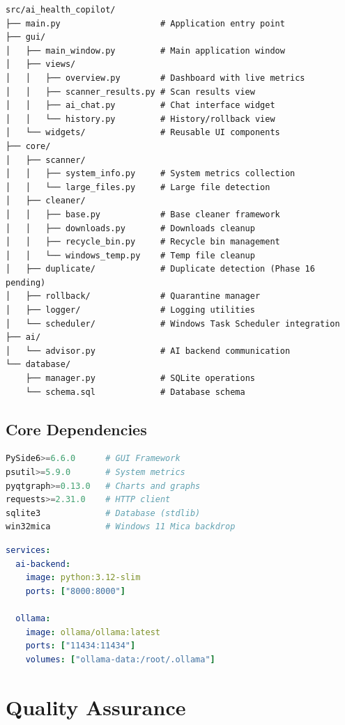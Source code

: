 \documentclass[11pt,a4paper]{article}
\begin{document}
\begin{verbatim}
src/ai_health_copilot/
├── main.py                    # Application entry point
├── gui/
│   ├── main_window.py         # Main application window
│   ├── views/
│   │   ├── overview.py        # Dashboard with live metrics
│   │   ├── scanner_results.py # Scan results view
│   │   ├── ai_chat.py         # Chat interface widget
│   │   └── history.py         # History/rollback view
│   └── widgets/               # Reusable UI components
├── core/
│   ├── scanner/
│   │   ├── system_info.py     # System metrics collection
│   │   └── large_files.py     # Large file detection
│   ├── cleaner/
│   │   ├── base.py            # Base cleaner framework
│   │   ├── downloads.py       # Downloads cleanup
│   │   ├── recycle_bin.py     # Recycle bin management
│   │   └── windows_temp.py    # Temp file cleanup
│   ├── duplicate/             # Duplicate detection (Phase 16 pending)
│   ├── rollback/              # Quarantine manager
│   ├── logger/                # Logging utilities
│   └── scheduler/             # Windows Task Scheduler integration
├── ai/
│   └── advisor.py             # AI backend communication
└── database/
    ├── manager.py             # SQLite operations
    └── schema.sql             # Database schema
\end{verbatim}

\subsection{Core Dependencies}

\begin{lstlisting}[language=Python,caption={Main Dependencies}]
PySide6>=6.6.0      # GUI Framework
psutil>=5.9.0       # System metrics
pyqtgraph>=0.13.0   # Charts and graphs
requests>=2.31.0    # HTTP client
sqlite3             # Database (stdlib)
win32mica           # Windows 11 Mica backdrop
\end{lstlisting}

\begin{lstlisting}[language=YAML,caption={Container Services}]
services:
  ai-backend:
    image: python:3.12-slim
    ports: ["8000:8000"]
    
  ollama:
    image: ollama/ollama:latest
    ports: ["11434:11434"]
    volumes: ["ollama-data:/root/.ollama"]
\end{lstlisting}

\section{Quality Assurance}
\end{document}
